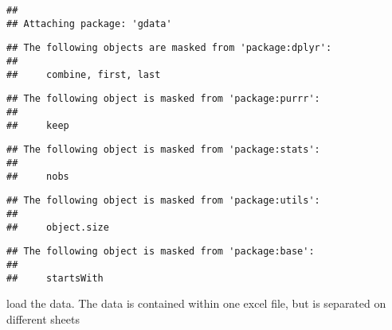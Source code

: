 \documentclass[]{article}
\begin{document}
\begin{verbatim}
## 
## Attaching package: 'gdata'
\end{verbatim}

\begin{verbatim}
## The following objects are masked from 'package:dplyr':
## 
##     combine, first, last
\end{verbatim}

\begin{verbatim}
## The following object is masked from 'package:purrr':
## 
##     keep
\end{verbatim}

\begin{verbatim}
## The following object is masked from 'package:stats':
## 
##     nobs
\end{verbatim}

\begin{verbatim}
## The following object is masked from 'package:utils':
## 
##     object.size
\end{verbatim}

\begin{verbatim}
## The following object is masked from 'package:base':
## 
##     startsWith
\end{verbatim}

load the data. The data is contained within one excel file, but is
separated on different sheets
\end{document}
